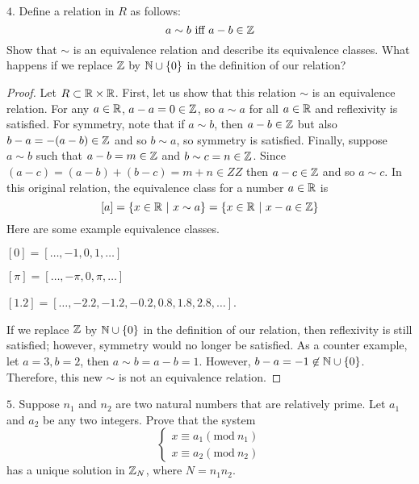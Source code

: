 \documentclass[12pt]{scrartcl}
\begin{document}
\newpage

$4.$ Define a relation in $R$ as follows: 
\[a \sim b \text{ iff } a - b \in \mathbb Z\]
Show that $\sim$ is an equivalence relation and describe its equivalence classes.
What happens if we replace $\mathbb Z$ by $\mathbb N \cup \{0\}$ in the definition of our relation?

\begin{proof}
  Let $R \subset \mathbb R \times \mathbb R$. First, let us show that this relation $\sim$ is an equivalence relation. 
  For any $a \in \mathbb R$, $a - a = 0 \in \mathbb Z$, so $a \sim a$ for all $a \in \mathbb R$ and reflexivity 
  is satisfied. For symmetry, note that if $a \sim b$, then $a - b \in \mathbb Z$ but also 
  $b -a = -(a-b) \in \mathbb Z$ and so $b \sim a$, so symmetry is satisfied. Finally, suppose $a\sim b$
  such that $a - b = m \in \mathbb Z$ and $b \sim c = n \in \mathbb Z$. Since $(a-c) = (a-b) + (b-c) = m + n \in ZZ$ then 
  $a-c\in \mathbb Z$ and so $a \sim c$. In this original relation, the equivalence class for a number $a \in \mathbb R$ is 
  \[[a] = \{x \in \mathbb R \ | \ x \sim a\} = \{x \in \mathbb R \ | \ x - a \in \mathbb Z\}\] 
  Here are some example equivalence classes. 
  
  $[0] = [\ldots, -1, 0, 1, \ldots]$
  
  $[\pi] = [\ldots, -\pi, 0, \pi, \ldots]$


  $[1.2] = [\ldots, -2.2, -1.2, -0.2, 0.8, 1.8, 2.8, \ldots]$.

  \hfill

  If we replace $\mathbb Z$ by $\mathbb N \cup \{0\}$ in the definition of our relation, then reflexivity is still satisfied; however, 
  symmetry would no longer be satisfied. As a counter example, let $a = 3, b = 2$, then $a \sim b = a - b = 1$. However, 
  $b - a = -1 \not\in \mathbb N \cup \{0\}$. Therefore, this new $\sim$ is not an equivalence relation.
\end{proof}

\newpage

$5.$ Suppose $n_1$ and $n_2$ are two natural numbers that are relatively prime. Let 
$a_1$ and $a_2$ be any two integers. Prove that the system 
\[\begin{cases}
  x \equiv a_1(\text{mod} \ n_1)\\
  x \equiv a_2(\text{mod} \ n_2)
\end{cases}\]
has a unique solution in $\mathbb Z_N$, where $N = n_1n_2$. 
\end{document}

